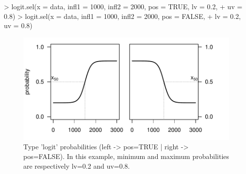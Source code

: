 \documentclass[letterpaper, 12pt]{article}
\begin{document}
\vspace*{\fill}
\newpage


\begin{Schunk}
\begin{Sinput}
> logit.sel(x = data, infl1 = 1000, infl2 = 2000, pos = TRUE, lv = 0.2, 
+     uv = 0.8)
> logit.sel(x = data, infl1 = 1000, infl2 = 2000, pos = FALSE, 
+     lv = 0.2, uv = 0.8)
\end{Sinput}
\end{Schunk}

\begin{figure}[h]
\vspace{-20pt}
\begin{center}
\includegraphics{relation_sel-027}
\end{center}
\vspace{-30pt}
\caption{Type 'logit' probabilities (left -> pos=TRUE |  right -> pos=FALSE). In this example, minimum and maximum probabilities are respectively lv=0.2 and uv=0.8.}
\vspace{-10pt}
\label{fig13}
\end{figure}

\newpage
\end{document}

